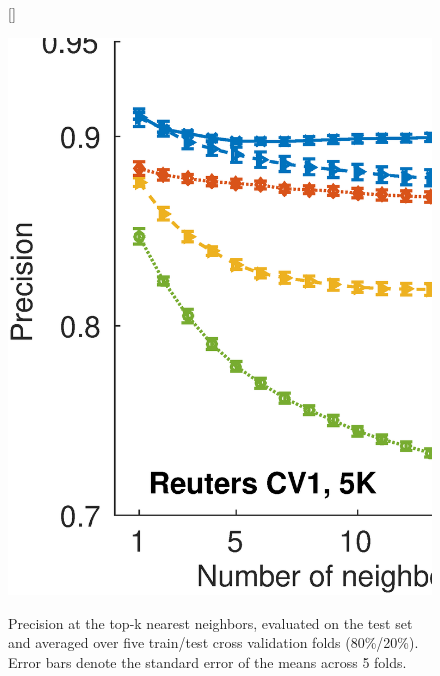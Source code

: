 \documentclass[twoside,11pt]{article}
\begin{document}
\begin{figure}[t]
    \captionsetup{font=small}
    [\FBwidth]
    {\caption{Precision at the top-k nearest neighbors, evaluated on the test set and averaged over five train/test cross validation folds (80\%/20\%). Error bars denote the standard error of the means across 5 folds.}\label{precFig}}
    {\includegraphics[width=12cm]{Precision_at_K_all_datasets}}
    \vskip -10pt
\end{figure}

\vspace{-6pt}
\end{document}

